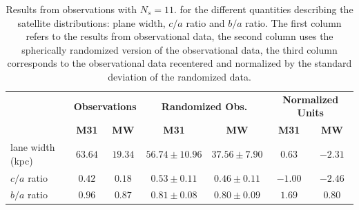 \documentclass[a4paper,fleqn,usenatbib]{mnras}
\begin{document}
\begin{table}
  \centering
  \renewcommand{\arraystretch}{1.2}
  \begin{tabular}{|p{2.5cm}|c|c|c|c|c|c|}
    \hline
    \multirow{2}{4.0cm}{} & \multicolumn{2}{c|}{\textbf{Observations}}
    & \multicolumn{2}{c|}{\textbf{Randomized Obs.}} &
    \multicolumn{2}{c|}{\textbf{Normalized Units}}\\
    \cline{2-7}
    & \textbf{M31} & \textbf{MW} & \textbf{M31} & \textbf{MW} & \textbf{M31} & \textbf{MW} \\
    \hline
lane width (kpc) & $63.64$ & $19.34$ & $56.74\pm10.96$ & $37.56\pm7.90$ & $0.63$ & $-2.31$\\\hline
$c/a$ ratio & $0.42$ & $0.18$ & $0.53\pm0.11$ & $0.46\pm0.11$ & $-1.00$ & $-2.46$\\\hline
$b/a$ ratio & $0.96$ & $0.87$ & $0.81\pm0.08$ & $0.80\pm0.09$ & $1.69$ & $0.80$\\\hline
  \end{tabular}
  \caption{Results from observations with $N_s=11$. 
    for the different
    quantities describing the satellite distributions: plane width, $c/a$
    ratio and $b/a$ ratio. 
    The first column refers to the results from
    observational data, the second column uses the spherically
    randomized version of the observational data, the third column
    corresponds to the observational data recentered and normalized
    by the standard deviation of the randomized data. \label{table:observations}}
\end{table}
\end{document}
